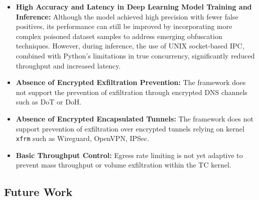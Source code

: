\documentclass [11pt, proquest] {uwthesis}[2020/02/24]
\begin{document}
\begin{itemize}[nosep]

\item \textbf{High Accuracy and Latency in Deep Learning Model Training and Inference:} Although the model achieved high precision with fewer false positives, its performance can still be improved by incorporating more complex poisoned dataset samples to address emerging obfuscation techniques. However, during inference, the use of UNIX socket-based IPC, combined with Python’s limitations in true concurrency, significantly reduced throughput and increased latency.

  \item \textbf{Absence of Encrypted Exfiltration Prevention:} The framework does not support the prevention of exfiltration through encrypted DNS channels such as DoT or DoH.

  \item \textbf{Absence of Encrypted Encapsulated Tunnels:} The framework does not support prevention of exfiltration over encrypted tunnels relying on kernel \texttt{xfrm} such as Wireguard, OpenVPN, IPSec. 

  \item \textbf{Basic Throughput Control:} Egress rate limiting is not yet adaptive to prevent mass throughput or volume exfiltration within the TC kernel. 
\end{itemize}

\subsection*{Future Work}
\end{document}
